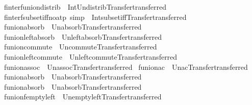 \begin{isabellebody}
\isamarkupfalse%
\ finter{\isacharunderscore}funion{\isacharunderscore}distrib{}\ {\isacharequal}\ Int{\isacharunderscore}Un{\isacharunderscore}distrib{}{\isacharbrackleft}Transfer{\isachardot}transferred{\isacharbrackright}\isanewline
{}\isamarkupfalse%
\ finter{\isacharunderscore}fsubset{\isacharunderscore}iff{\isacharbrackleft}no{\isacharunderscore}atp{\isacharcomma}\ simp{\isacharbrackright}\ {\isacharequal}\ Int{\isacharunderscore}subset{\isacharunderscore}iff{\isacharbrackleft}Transfer{\isachardot}transferred{\isacharbrackright}\isanewline
{}\isamarkupfalse%
\ funion{\isacharunderscore}absorb\ {\isacharequal}\ Un{\isacharunderscore}absorb{\isacharbrackleft}Transfer{\isachardot}transferred{\isacharbrackright}\isanewline
{}\isamarkupfalse%
\ funion{\isacharunderscore}left{\isacharunderscore}absorb\ {\isacharequal}\ Un{\isacharunderscore}left{\isacharunderscore}absorb{\isacharbrackleft}Transfer{\isachardot}transferred{\isacharbrackright}\isanewline
{}\isamarkupfalse%
\ funion{\isacharunderscore}commute\ {\isacharequal}\ Un{\isacharunderscore}commute{\isacharbrackleft}Transfer{\isachardot}transferred{\isacharbrackright}\isanewline
{}\isamarkupfalse%
\ funion{\isacharunderscore}left{\isacharunderscore}commute\ {\isacharequal}\ Un{\isacharunderscore}left{\isacharunderscore}commute{\isacharbrackleft}Transfer{\isachardot}transferred{\isacharbrackright}\isanewline
{}\isamarkupfalse%
\ funion{\isacharunderscore}assoc\ {\isacharequal}\ Un{\isacharunderscore}assoc{\isacharbrackleft}Transfer{\isachardot}transferred{\isacharbrackright}\isanewline
{}\isamarkupfalse%
\ funion{\isacharunderscore}ac\ {\isacharequal}\ Un{\isacharunderscore}ac{\isacharbrackleft}Transfer{\isachardot}transferred{\isacharbrackright}\isanewline
{}\isamarkupfalse%
\ funion{\isacharunderscore}absorb{}\ {\isacharequal}\ Un{\isacharunderscore}absorb{}{\isacharbrackleft}Transfer{\isachardot}transferred{\isacharbrackright}\isanewline
{}\isamarkupfalse%
\ funion{\isacharunderscore}absorb{}\ {\isacharequal}\ Un{\isacharunderscore}absorb{}{\isacharbrackleft}Transfer{\isachardot}transferred{\isacharbrackright}\isanewline
{}\isamarkupfalse%
\ funion{\isacharunderscore}fempty{\isacharunderscore}left\ {\isacharequal}\ Un{\isacharunderscore}empty{\isacharunderscore}left{\isacharbrackleft}Transfer{\isachardot}transferred{\isacharbrackright}\isanewline

\end{isabellebody}
